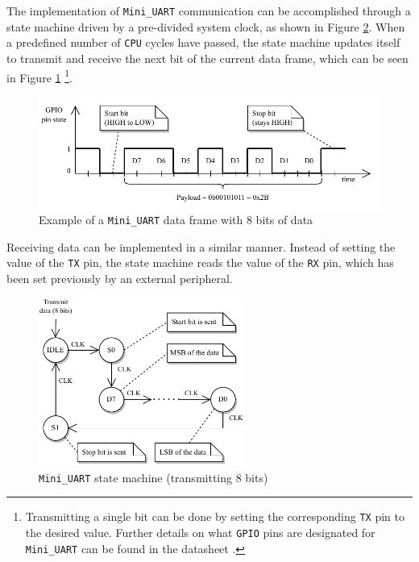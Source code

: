 \documentclass[english, ing, kiv, he, iso690numb, pdf]{fasthesis}
\begin{document}
	The implementation of \texttt{Mini\_UART} communication can be accomplished through a state machine driven by a pre-divided system clock, as shown in Figure \ref{Mini_UART state machine}. When a predefined number of \texttt{CPU} cycles have passed, the state machine updates itself to transmit and receive the next bit of the current data frame, which can be seen in Figure \ref{Example of a Mini_UART data frame with 8 bits of data} \footnote{Transmitting a single bit can be done by setting the corresponding \texttt{TX} pin to the desired value. Further details on what \texttt{GPIO} pins are designated for \texttt{Mini\_UART} can be found in the datasheet \cite{BCM2835}.}.
	
	\begin{figure}[ht]
		\centering
		\includegraphics[width=1.0\textwidth]{img/diagrams/mini_uart.pdf}
		\caption{Example of a \texttt{Mini\_UART} data frame with 8 bits of data}
		\label{Example of a Mini_UART data frame with 8 bits of data}
	\end{figure}
	
	Receiving data can be implemented in a similar manner. Instead of setting the value of the \texttt{TX} pin, the state machine reads the value of the \texttt{RX} pin, which has been set previously by an external peripheral.
	
	\newpage
	
	\begin{figure}[ht]
		\centering
		\includegraphics[width=0.6\textwidth]{img/diagrams/mini_uart_state_machine.pdf}
		\caption{\texttt{Mini\_UART} state machine (transmitting 8 bits)}
		\label{Mini_UART state machine}
	\end{figure}
	
\end{document}
